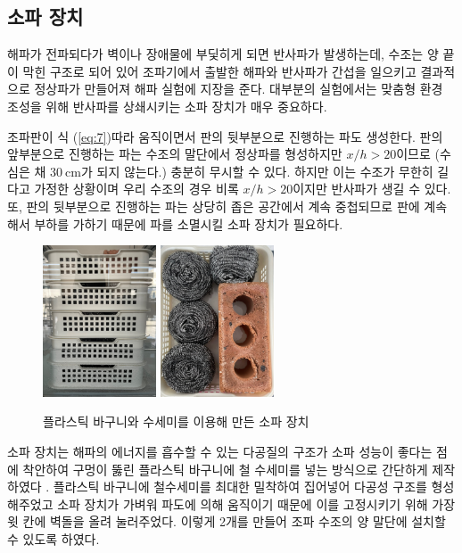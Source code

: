 \subsection{소파 장치}
해파가 전파되다가 벽이나 장애물에 부딫히게 되면 반사파가 발생하는데, 수조는 양 끝이 막힌 구조로 되어 있어 조파기에서 출발한 해파와 반사파가 간섭을 일으키고 결과적으로 정상파가 만들어져 해파 실험에 지장을 준다. 대부분의 실험에서는 맞춤형 환경 조성을 위해 반사파를 상쇄시키는 소파 장치가 매우 중요하다.

조파판이 식 (\ref{eq:7})\을 따라 움직이면서 판의 뒷부분으로 진행하는 파도 생성한다. 판의 앞부분으로 진행하는 파는 수조의 말단에서 정상파를 형성하지만 $x/h > 20$이므로 (수심은 채 $30\mathrm{~cm}$가 되지 않는다.) 충분히 무시할 수 있다. 하지만 이는 수조가 무한히 길다고 가정한 상황이며 우리 수조의 경우 비록 $x/h > 20$이지만 반사파가 생길 수 있다. 또, 판의 뒷부분으로 진행하는 파는 상당히 좁은 공간에서 계속 중첩되므로 판에 계속해서 부하를 가하기 때문에 파를 소멸시킬 소파 장치가 필요하다.

\begin{figure}[h]
	\begin{center}
		\includegraphics[width=0.3\textwidth]{images/sopagi1.jpg}
		\includegraphics[width=0.3\textwidth]{images/sopagi2.jpg}
		\caption{플라스틱 바구니와 수세미를 이용해 만든 소파 장치}
		\label{Waveabsorber}
	\end{center}
\end{figure}

소파 장치는 해파의 에너지를 흡수할 수 있는 다공질의 구조가 소파 성능이 좋다는 점에 착안하여 구멍이 뚫린 플라스틱 바구니에 철 수세미를 넣는 방식으로 간단하게 제작하였다 \cite{lim2014optimum, o2017methods}. 플라스틱 바구니에 철수세미를 최대한 밀착하여 집어넣어 다공성 구조를 형성해주었고 소파 장치가 가벼워 파도에 의해 움직이기 때문에 이를 고정시키기 위해 가장 윗 칸에 벽돌을 올려 눌러주었다. 이렇게 2개를 만들어 조파 수조의 양 말단에 설치할 수 있도록 하였다. 

